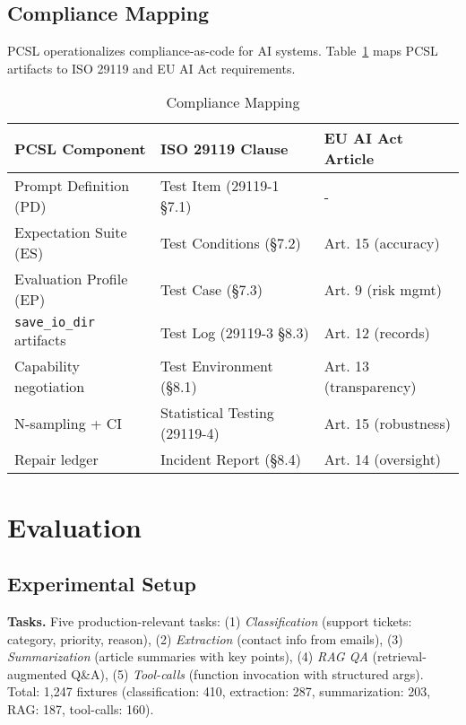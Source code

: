 \documentclass[sigconf]{acmart}
\begin{document}
\subsection{Compliance Mapping}

PCSL operationalizes compliance-as-code for AI systems. Table~\ref{tab:compliance} maps PCSL artifacts to ISO 29119 and EU AI Act requirements.

\begin{table}[t]
\centering
\caption{Compliance Mapping}
\label{tab:compliance}
\scriptsize
\begin{tabular}{@{}p{2.2cm}p{2.2cm}p{2.2cm}@{}}
\toprule
\textbf{PCSL Component} & \textbf{ISO 29119 Clause} & \textbf{EU AI Act Article} \\
\midrule
Prompt Definition (PD) & Test Item (29119-1 §7.1) & - \\
Expectation Suite (ES) & Test Conditions (§7.2) & Art. 15 (accuracy) \\
Evaluation Profile (EP) & Test Case (§7.3) & Art. 9 (risk mgmt) \\
\texttt{save\_io\_dir} artifacts & Test Log (29119-3 §8.3) & Art. 12 (records) \\
Capability negotiation & Test Environment (§8.1) & Art. 13 (transparency) \\
N-sampling + CI & Statistical Testing (29119-4) & Art. 15 (robustness) \\
Repair ledger & Incident Report (§8.4) & Art. 14 (oversight) \\
\bottomrule
\end{tabular}
\end{table}

\section{Evaluation}

\subsection{Experimental Setup}

\textbf{Tasks.} Five production-relevant tasks: (1) \textit{Classification} (support tickets: category, priority, reason), (2) \textit{Extraction} (contact info from emails), (3) \textit{Summarization} (article summaries with key points), (4) \textit{RAG QA} (retrieval-augmented Q\&A), (5) \textit{Tool-calls} (function invocation with structured args). Total: 1,247 fixtures (classification: 410, extraction: 287, summarization: 203, RAG: 187, tool-calls: 160).
\end{document}
